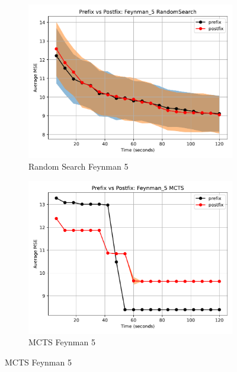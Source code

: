 \documentclass[runningheads]{llncs}
\begin{document}
\begin{figure}
    \centering
    
    \begin{subfigure}[b]{0.4\textwidth}
        \includegraphics[width=\linewidth, keepaspectratio]{AIFeynman_Benchmarks/PrePostFeynman_5RandomSearch.pdf}
        \caption{Random Search Feynman 5}
        \label{subfig:feynman_5_RS}
    \end{subfigure}
    \begin{subfigure}[b]{0.4\textwidth}
        \includegraphics[width=\linewidth, keepaspectratio]{AIFeynman_Benchmarks/PrePostFeynman_5MCTS.pdf}
        \caption{MCTS Feynman 5}
        \label{subfig:feynman_5_MCTS}
    \end{subfigure}
    

\end{figure}
\end{document}
